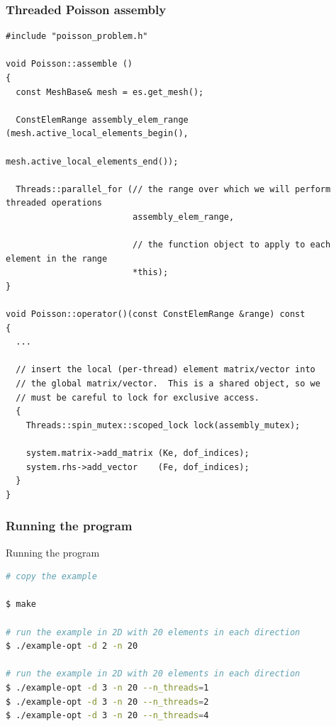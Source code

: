 \begin{frame}
  \frametitle{Threaded Poisson assembly}

  \begin{lstlisting}
#include "poisson_problem.h"

void Poisson::assemble ()
{
  const MeshBase& mesh = es.get_mesh();

  ConstElemRange assembly_elem_range (mesh.active_local_elements_begin(),
                                      mesh.active_local_elements_end());

  Threads::parallel_for (// the range over which we will perform threaded operations
                         assembly_elem_range,

                         // the function object to apply to each element in the range
                         *this);
}

void Poisson::operator()(const ConstElemRange &range) const
{
  ...

  // insert the local (per-thread) element matrix/vector into
  // the global matrix/vector.  This is a shared object, so we
  // must be careful to lock for exclusive access.
  {
    Threads::spin_mutex::scoped_lock lock(assembly_mutex);
    
    system.matrix->add_matrix (Ke, dof_indices);
    system.rhs->add_vector    (Fe, dof_indices);
  }
}
  \end{lstlisting}
\end{frame}
\begin{frame}[fragile]
  \frametitle{Running the program}
    \begin{block}{Running the program}
    \begin{lstlisting}[language=bash]
# copy the example

$ make

# run the example in 2D with 20 elements in each direction
$ ./example-opt -d 2 -n 20 

# run the example in 2D with 20 elements in each direction
$ ./example-opt -d 3 -n 20 --n_threads=1
$ ./example-opt -d 3 -n 20 --n_threads=2
$ ./example-opt -d 3 -n 20 --n_threads=4

    \end{lstlisting}
  \end{block}
\end{frame}

